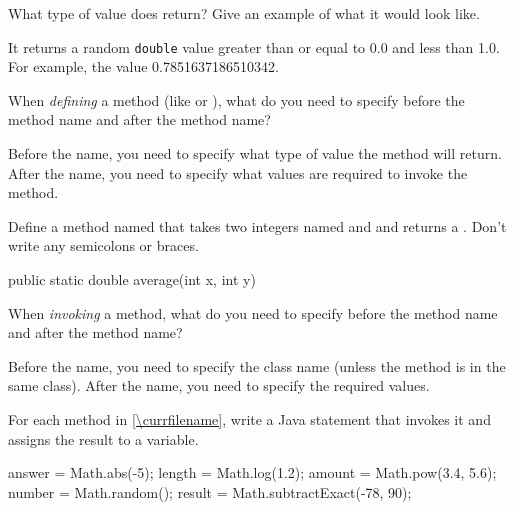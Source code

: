 \Q What type of value does  return? Give an example of what it would look like.

\begin{answer}[3em]
It returns a random \texttt{double} value greater than or equal to 0.0 and less than 1.0.
For example, the value 0.7851637186510342.
\end{answer}


\Q When {\it defining} a method (like  or ), what do you need to specify before the method name and after the method name?

\begin{answer}
Before the name, you need to specify what type of value the method will return.
After the name, you need to specify what values are required to invoke the method.
\end{answer}


\Q \label{methsig}
Define a method named  that takes two integers named  and  and returns a . Don't write any semicolons or braces.

\begin{answer}[3em]
\begin{javaans}
public static double average(int x, int y)
\end{javaans}
\end{answer}


\Q When {\it invoking} a method, what do you need to specify before the method name and after the method name?

\begin{answer}
Before the name, you need to specify the class name (unless the method is in the same class).
After the name, you need to specify the required values.
\end{answer}


\Q For each method in \ref{\currfilename}, write a Java statement that invokes it and assigns the result to a variable.

\begin{answer}[7em]
\vspace{-1ex}
\begin{javaans}
answer = Math.abs(-5);
length = Math.log(1.2);
amount = Math.pow(3.4, 5.6);
number = Math.random();
result = Math.subtractExact(-78, 90);
\end{javaans}
\end{answer}




